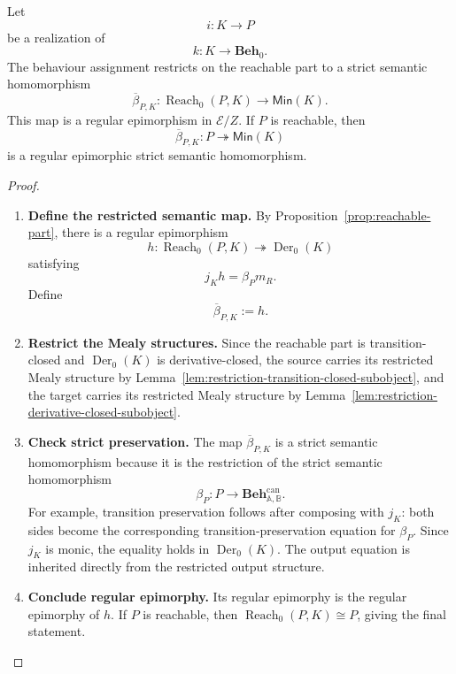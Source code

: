 \begin{theorem}
\label{thm:semantic-quotient-theorem}
    Let
    \[
        i:K\to P
    \]
    be a realization of
    \[
        k:K\to\mathbf{Beh}_0.
    \]
    The behaviour assignment restricts on the reachable part to a strict semantic homomorphism
    \[
        \overline{\beta}_{P,K}:
        \operatorname{Reach}_0(P,K)\to\mathsf{Min}(K).
    \]
    This map is a regular epimorphism in \(\mathcal E/Z\). If \(P\) is reachable, then
    \[
        \overline{\beta}_{P,K}:P\twoheadrightarrow\mathsf{Min}(K)
    \]
    is a regular epimorphic strict semantic homomorphism.
\end{theorem}
\begin{proof}
    \leavevmode
    \begin{enumerate}
        \item \textbf{Define the restricted semantic map.} By Proposition~\ref{prop:reachable-part}, there is a regular epimorphism
        \[
            h:\operatorname{Reach}_0(P,K)\twoheadrightarrow\operatorname{Der}_0(K)
        \]
        satisfying
        \[
            j_Kh=\beta_Pm_R.
        \]
        Define
        \[
            \overline{\beta}_{P,K}:=h.
        \]

        \item \textbf{Restrict the Mealy structures.} Since the reachable part is transition-closed and \(\operatorname{Der}_0(K)\) is derivative-closed, the source carries its restricted Mealy structure by Lemma~\ref{lem:restriction-transition-closed-subobject}, and the target carries its restricted Mealy structure by Lemma~\ref{lem:restriction-derivative-closed-subobject}.

        \item \textbf{Check strict preservation.} The map \(\overline{\beta}_{P,K}\) is a strict semantic homomorphism because it is the restriction of the strict semantic homomorphism
        \[
            \beta_P:P\to
            \mathbf{Beh}^{\mathrm{can}}_{\mathbb A,\mathbb B}.
        \]
        For example, transition preservation follows after composing with \(j_K\): both sides become the corresponding transition-preservation equation for \(\beta_P\). Since \(j_K\) is monic, the equality holds in \(\operatorname{Der}_0(K)\). The output equation is inherited directly from the restricted output structure.

        \item \textbf{Conclude regular epimorphy.} Its regular epimorphy is the regular epimorphy of \(h\). If \(P\) is reachable, then \(\operatorname{Reach}_0(P,K)\cong P\), giving the final statement.
    \end{enumerate}
\end{proof}

